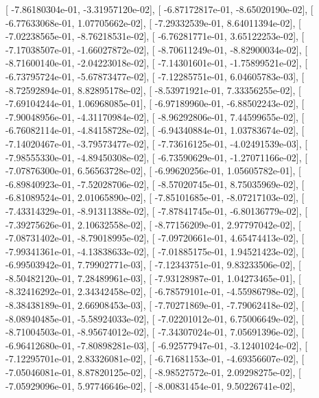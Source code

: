 \documentclass{article}
\begin{document}
       [ -7.86180304e-01,  -3.31957120e-02],
       [ -6.87172817e-01,  -8.65020190e-02],
       [ -6.77633068e-01,   1.07705662e-02],
       [ -7.29332539e-01,   8.64011394e-02],
       [ -7.02238565e-01,  -8.76218531e-02],
       [ -6.76281771e-01,   3.65122253e-02],
       [ -7.17038507e-01,  -1.66027872e-02],
       [ -8.70611249e-01,  -8.82900034e-02],
       [ -8.71600140e-01,  -2.04223018e-02],
       [ -7.14301601e-01,  -1.75899521e-02],
       [ -6.73795724e-01,  -5.67873477e-02],
       [ -7.12285751e-01,   6.04605783e-03],
       [ -8.72592894e-01,   8.82895178e-02],
       [ -8.53971921e-01,   7.33356255e-02],
       [ -7.69104244e-01,   1.06968085e-01],
       [ -6.97189960e-01,  -6.88502243e-02],
       [ -7.90048956e-01,  -4.31170984e-02],
       [ -8.96292806e-01,   7.44599655e-02],
       [ -6.76082114e-01,  -4.84158728e-02],
       [ -6.94340884e-01,   1.03783674e-02],
       [ -7.14020467e-01,  -3.79573477e-02],
       [ -7.73616125e-01,  -4.02491539e-03],
       [ -7.98555330e-01,  -4.89450308e-02],
       [ -6.73590629e-01,  -1.27071166e-02],
       [ -7.07876300e-01,   6.56563728e-02],
       [ -6.99620256e-01,   1.05605782e-01],
       [ -6.89840923e-01,  -7.52028706e-02],
       [ -8.57020745e-01,   8.75035969e-02],
       [ -6.81089524e-01,   2.01065890e-02],
       [ -7.85101685e-01,  -8.07217103e-02],
       [ -7.43314329e-01,  -8.91311388e-02],
       [ -7.87841745e-01,  -6.80136779e-02],
       [ -7.39275626e-01,   2.10632558e-02],
       [ -8.77156209e-01,   2.97797042e-02],
       [ -7.08731402e-01,  -8.79018995e-02],
       [ -7.09720661e-01,   4.65474413e-02],
       [ -7.99341361e-01,  -4.13838633e-02],
       [ -7.01885175e-01,   1.94521423e-02],
       [ -6.99503942e-01,   7.79902771e-03],
       [ -7.12343751e-01,   9.83233506e-02],
       [ -8.50482120e-01,   7.28489961e-03],
       [ -7.93128987e-01,   1.04273465e-01],
       [ -8.32416292e-01,   2.34342458e-02],
       [ -6.78579101e-01,  -4.55986798e-02],
       [ -8.38438189e-01,   2.66908453e-03],
       [ -7.70271869e-01,  -7.79062418e-02],
       [ -8.08940485e-01,  -5.58924033e-02],
       [ -7.02201012e-01,   6.75006649e-02],
       [ -8.71004503e-01,  -8.95674012e-02],
       [ -7.34307024e-01,   7.05691396e-02],
       [ -6.96412680e-01,  -7.80898281e-03],
       [ -6.92577947e-01,  -3.12401024e-02],
       [ -7.12295701e-01,   2.83326081e-02],
       [ -6.71681153e-01,  -4.69356607e-02],
       [ -7.05046081e-01,   8.87820125e-02],
       [ -8.98527572e-01,   2.09298275e-02],
       [ -7.05929096e-01,   5.97746646e-02],
       [ -8.00831454e-01,   9.50226741e-02],
\end{document}

